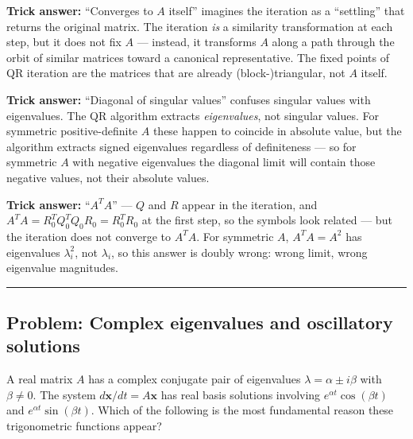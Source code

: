 \documentclass[12pt]{amsart}
\newcommand{\divider}{
  \vspace{-1em}
  \noindent
  \raisebox{-0.15ex}{\textbullet}%
  \hspace{0.5em}%
  \rule[0.5ex]{0.95\textwidth}{1.0pt}%
  \hspace{0.5em}%
  \raisebox{-0.15ex}{\textbullet}%
  \vspace{0em}
}
\begin{document}
\textbf{Trick answer:}
``Converges to $A$ itself'' imagines the iteration as a ``settling'' that
returns the original matrix. The iteration \emph{is} a similarity
transformation at each step, but it does not fix $A$ --- instead, it
transforms $A$ along a path through the orbit of similar matrices toward a
canonical representative. The fixed points of QR iteration are the matrices
that are already (block-)triangular, not $A$ itself.

\textbf{Trick answer:}
``Diagonal of singular values'' confuses singular values with eigenvalues.
The QR algorithm extracts \emph{eigenvalues}, not singular values. For
symmetric positive-definite $A$ these happen to coincide in absolute value,
but the algorithm extracts signed eigenvalues regardless of definiteness
--- so for symmetric $A$ with negative eigenvalues the diagonal limit will
contain those negative values, not their absolute values.

\textbf{Trick answer:}
``$A^T A$'' --- $Q$ and $R$ appear in the iteration, and $A^T A = R_0^T Q_0^T Q_0 R_0 = R_0^T R_0$
at the first step, so the symbols look related --- but the iteration does
not converge to $A^T A$. For symmetric $A$, $A^T A = A^2$ has eigenvalues
$\lambda_i^2$, not $\lambda_i$, so this answer is doubly wrong: wrong limit,
wrong eigenvalue magnitudes.

\divider

\subsection*{Problem: Complex eigenvalues and oscillatory solutions}

A real matrix $A$ has a complex conjugate pair of eigenvalues $\lambda = \alpha \pm i\beta$
with $\beta \neq 0$. The system $d\mathbf{x}/dt = A\mathbf{x}$ has real basis
solutions involving $e^{\alpha t} \cos(\beta t)$ and $e^{\alpha t} \sin(\beta t)$.
Which of the following is the most fundamental reason these trigonometric
functions appear?
\end{document}
